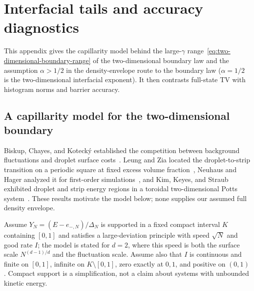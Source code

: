\section{Interfacial tails and accuracy diagnostics}
\label{sec:capillarity-diagnostics}

This appendix gives the capillarity model behind the large-$\gamma$
range~\eqref{eq:two-dimensional-boundary-range} of the
two-dimensional boundary law and the assumption $\alpha>1/2$ in the
density-envelope route to the boundary law ($\alpha=1/2$ is the
two-dimensional interfacial exponent). It then contrasts full-state TV
with histogram norms and barrier accuracy.

\subsection{A capillarity model for the two-dimensional boundary}

Biskup, Chayes, and Koteck\'y established the competition between
background fluctuations and droplet surface
costs~\cite{BiskupChayesKotecky2002}. Leung and Zia located the
droplet-to-strip transition on a periodic square at fixed excess
volume fraction~\cite{LeungZia1990}, Neuhaus and Hager analyzed it for
first-order simulations~\cite{NeuhausHager2003}, and Kim, Keyes, and
Straub exhibited droplet and strip energy regions in a toroidal
two-dimensional Potts system~\cite{KimKeyesStraub2011}. These
results motivate the model below; none supplies our assumed full
density envelope.

Assume $Y_N=(E-e_{-,N})/\Delta_N$ is supported in a fixed compact
interval $K$ containing $[0,1]$ and satisfies a large-deviation
principle with speed $\sqrt N$ and good rate $I$; the model is stated
for $d=2$, where this speed is both the surface scale $N^{(d-1)/d}$ and
the fluctuation scale.
Assume also that $I$ is continuous and finite on $[0,1]$, infinite on
$K\setminus[0,1]$, zero exactly at $0,1$, and positive on $(0,1)$.
Compact support is a simplification, not a claim about systems with
unbounded kinetic energy.

